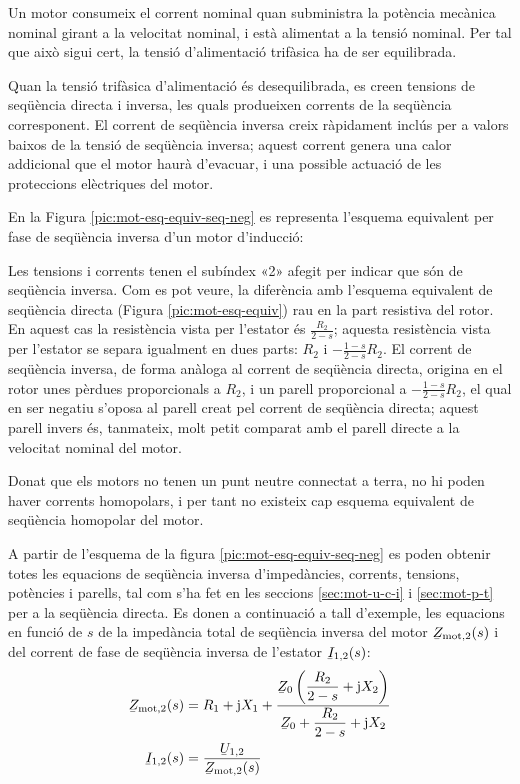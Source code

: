 Un motor consumeix el corrent nominal quan subministra la potència mecànica nominal girant a la velocitat nominal, i està alimentat a la tensió nominal. Per tal que això sigui cert, la tensió d'alimentació trifàsica ha de ser equilibrada.

Quan la tensió trifàsica d'alimentació és desequilibrada, es creen tensions de seqüència directa i inversa, les quals  produeixen corrents de la seqüència corresponent. El corrent de seqüència inversa creix ràpidament inclús per a valors baixos de  la tensió de seqüència inversa; aquest corrent genera una calor addicional que el motor haurà d'evacuar, i una possible actuació de les proteccions elèctriques del motor.

En la Figura \vref{pic:mot-esq-equiv-seq-neg} es representa l'esquema equivalent per fase de seqüència inversa d'un   motor d'inducció:

\begin{center}
	
	\label{pic:mot-esq-equiv-seq-neg}
\end{center}

Les tensions i corrents tenen el subíndex «2» afegit per indicar que són de seqüència inversa. Com es pot veure, la diferència amb l'esquema equivalent de seqüència directa (Figura \vref{pic:mot-esq-equiv}) rau en la part resistiva del rotor. En aquest cas la resistència vista per l'estator és $\frac{R_2}{2-s}$; aquesta resistència vista per l'estator se separa igualment en dues parts: $R_2$ i $-\frac{1-s}{2-s} R_2$. El corrent de seqüència inversa, de forma anàloga al corrent de seqüència directa,  origina en el rotor unes pèrdues proporcionals a $R_2$, i un parell proporcional a $-\frac{1-s}{2-s} R_2$, el qual en ser negatiu s'oposa al parell creat pel corrent de seqüència directa; aquest parell invers és, tanmateix, molt petit comparat amb el parell directe a la velocitat nominal del motor.

Donat que els motors no tenen un punt neutre connectat a terra, no hi poden haver corrents homopolars, i per tant no existeix cap esquema equivalent de seqüència homopolar del motor.

A partir de l'esquema de la figura \vref{pic:mot-esq-equiv-seq-neg} es poden obtenir totes les equacions de seqüència inversa d'impedàncies, corrents, tensions, potències i parells, tal com s'ha fet en les seccions \ref{sec:mot-u-c-i} i \ref{sec:mot-p-t} per a la seqüència directa. Es donen a continuació a tall d'exemple, les equacions en funció de $s$ de la impedància total de seqüència inversa del motor $\cmplx{Z}\ped{mot,2}(s)$ i del corrent de fase de seqüència inversa de l'estator $\cmplx{I}_{1,2}(s)$:
\begin{align}
	\cmplx{Z}\ped{mot,2}(s) &= R_1 + \ju X_1 + \frac{\cmplx{Z}_0 \left( \dfrac{R_2}{2-s} + \ju X_2\right)}{\cmplx{Z}_0 +  \dfrac{R_2}{2-s} + \ju X_2}\label{eq:mot-Zmot-inv}\\
	\cmplx{I}_{1,2}(s) &= \frac{\cmplx{U}_{1,2}}{\cmplx{Z}\ped{mot,2}(s)}\label{eq:mot-I1-inv}
\end{align}

